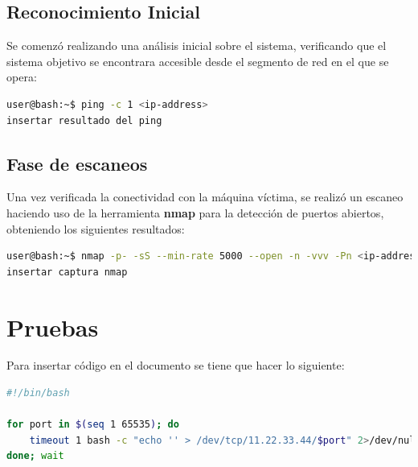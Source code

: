 \documentclass[a4paper]{article} %
\begin{document}
        \subsection{Reconocimiento Inicial}
        \vspace{0.2cm}
        Se comenzó realizando una análisis inicial sobre el sistema, verificando que el sistema objetivo se encontrara accesible desde el segmento de red en el que se opera:
        
        \begin{lstlisting}[language=Bash, caption=Reconocimiento inicial sobre la máquina víctima]
user@bash:~$ ping -c 1 <ip-address>
insertar resultado del ping
        \end{lstlisting}
        
        \vspace{0.3cm}
        
        \subsection{Fase de escaneos}
        Una vez verificada la conectividad con la máquina víctima, se realizó un escaneo haciendo uso de la herramienta \textbf{nmap} para la detección de puertos abiertos, obteniendo los siguientes resultados:
        
        \vspace{0.2cm}
        
        \begin{lstlisting}[language=Bash, caption=Escaneo de puertos a la máquina víctima]
user@bash:~$ nmap -p- -sS --min-rate 5000 --open -n -vvv -Pn <ip-address> -oG allPorts
insertar captura nmap
        \end{lstlisting}
        
        \clearpage
        
        
    \section{Pruebas}
    Para insertar código en el documento se tiene que hacer lo siguiente:
        
    \vspace{0.3cm}
        
    \begin{lstlisting}[language=Bash, caption=Script personalizado para ...]
#!/bin/bash
            
for port in $(seq 1 65535); do
    timeout 1 bash -c "echo '' > /dev/tcp/11.22.33.44/$port" 2>/dev/null && echo "Port $port - Open" &
done; wait
    \end{lstlisting}
        
\end{document}
